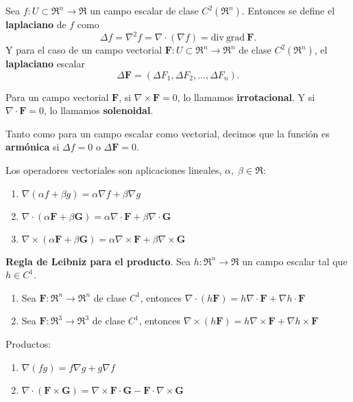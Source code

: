 \begin{definition}
    Sea $f:U\subset\Re^n\to\Re$ un campo escalar de clase $C^2(\Re^n)$. Entonces se define el \textbf{laplaciano} de $f$ como
    \[
        \Delta f=\nabla^2f=\nabla\cdot(\nabla f)=\text{div}\:\text{grad}\:\mathbf{F}.  
    \]
    Y para el caso de un campo vectorial $\mathbf{F}:U\subset\Re^n\to\Re^n$ de clase $C^2(\Re^n)$, el \textbf{laplaciano} escalar
    \[
        \Delta\mathbf{F}=(\Delta F_1,\Delta F_2,\ldots,\Delta F_n).  
    \]
\end{definition}
\begin{definition}
    Para un campo vectorial $\mathbf{F}$, si $\nabla\times\mathbf{F}=0$, lo llamamos \textbf{irrotacional}. Y si $\nabla\cdot\mathbf{F}=0$, lo llamamos \textbf{solenoidal}.
\end{definition}
\begin{definition}
    Tanto como para un campo escalar como vectorial, decimos que la funci\'on es \textbf{arm\'onica} si $\Delta f=0$ o $\Delta \mathbf{F}=0$.
\end{definition}
\begin{propertie}
    Los operadores vectoriales son aplicaciones lineales, $\alpha,\;\beta\in\Re$:
    \begin{enumerate}
        \item \(\nabla(\alpha f+\beta g)=\alpha\nabla f+\beta\nabla g\)
        \item \(\nabla\cdot(\alpha \mathbf{F}+\beta \mathbf{G})=\alpha\nabla\cdot\mathbf{F}+\beta\nabla\cdot\mathbf{G}\)
        \item \(\nabla\times(\alpha \mathbf{F}+\beta \mathbf{G})=\alpha\nabla\times\mathbf{F}+\beta\nabla\times\mathbf{G}\)
    \end{enumerate}
\end{propertie}
\begin{propertie}
    \textbf{Regla de Leibniz para el producto}. Sea $h:\Re^n\to\Re$ un campo escalar tal que $h\in C^1$.
    \begin{enumerate}
        \item Sea $\mathbf{F}:\Re^n\to\Re^n$ de clase $C^1$, entonces $\nabla\cdot(h\mathbf{F})=h\nabla\cdot\mathbf{F}+\nabla h\cdot\mathbf{F}$
        \item Sea $\mathbf{F}:\Re^3\to\Re^3$ de clase $C^1$, entonces $\nabla\times(h\mathbf{F})=h\nabla\times\mathbf{F}+\nabla h\times\mathbf{F}$
    \end{enumerate}
\end{propertie}
\begin{propertie}
    Productos:
    \begin{enumerate}
        \item $\nabla(fg)=f\nabla g+g\nabla f$
        \item $\nabla\cdot(\mathbf{F}\times\mathbf{G})=\nabla\times\mathbf{F}\cdot\mathbf{G}-\mathbf{F}\cdot\nabla\times\mathbf{G}$
    \end{enumerate}
\end{propertie}